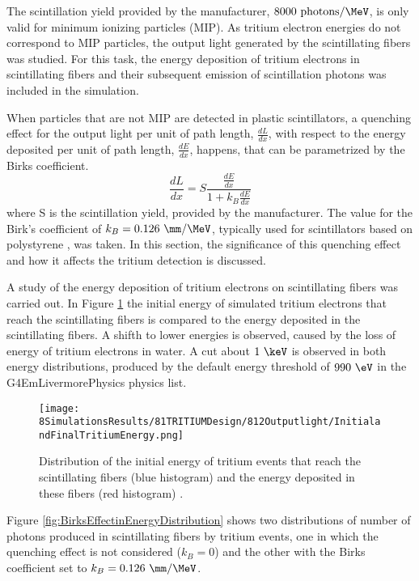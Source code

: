 The scintillation yield provided by the manufacturer, $8000~\text{photons}/\MeV$, is only valid for minimum ionizing particles (MIP). As tritium electron energies do not correspond to MIP particles, the output light generated by the scintillating fibers was studied. For this task, the energy deposition of tritium electrons in scintillating fibers and their subsequent emission of scintillation photons was included in the simulation.

When particles that are not MIP are detected in plastic scintillators, a quenching effect for the output light per unit of path length, $\frac{dL}{dx}$, with respect to the energy deposited per unit of path length, $\frac{dE}{dx}$, happens, that can be parametrized by the Birks coefficient\cite{BirksPaper}.
\begin{equation}
\frac{dL}{dx}= S\frac{\displaystyle{\frac{dE}{dx}}}{1+k_B\displaystyle{\frac{dE}{dx}}}
\label{eq:birkscoefficient}
\end{equation}
where S is the scintillation yield, provided by the manufacturer. The value for the Birk's coefficient of $k_B=0.126~\mm/\MeV$, typically used for scintillators based on polystyrene \cite{BirksCoefficient}, was taken. In this section, the significance of this quenching effect and how it affects the tritium detection is discussed.

A study of the energy deposition of tritium electrons on scintillating fibers was carried out. In Figure \ref{fig:InitialFinalTritiumEnergy} the initial energy of simulated tritium electrons that reach the scintillating fibers is compared to the energy deposited in the scintillating fibers. A shifth to lower energies is observed, caused by the loss of energy of tritium electrons in water. A cut about $1~\keV$ is observed in both energy distributions, produced by the default energy threshold of $990~\eV$ in the G4EmLivermorePhysics physics list.

\begin{figure}[h]
\centering
\texttt{[image: 8SimulationsResults/81TRITIUMDesign/812Outputlight/InitialandFinalTritiumEnergy.png]}
\caption{Distribution of the initial energy of tritium events that reach the scintillating fibers (blue histogram) and the energy deposited in these fibers (red histogram) \cite{SimulationPaperCarlos}.\label{fig:InitialFinalTritiumEnergy}}
\end{figure}

Figure \ref{fig:BirksEffectinEnergyDistribution} shows two distributions of number of photons produced in scintillating fibers by tritium events, one in which the quenching effect is not considered ($k_B=0$) and the other with the Birks coefficient set to $k_B=0.126~\mm/\MeV$.

